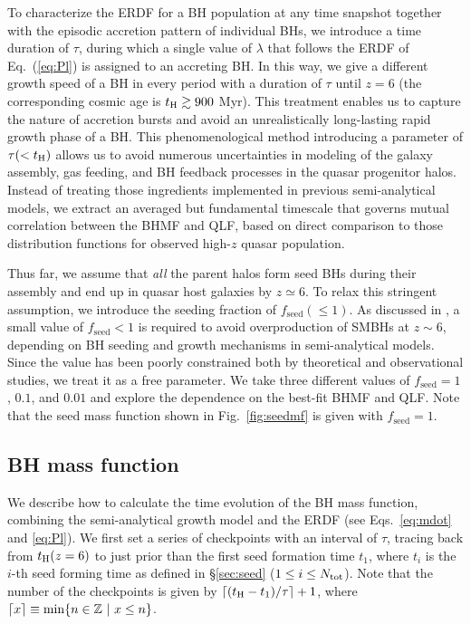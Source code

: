 \documentclass[twocolumn, twocolappendix]{aastex63}
\newcommand{\tlife}{\tau}
\newcommand{\fseed}{f_\mathrm{seed}}
\newcommand{\Nt}{N_\mathrm{t}}
\begin{document}
\begin{CJK*}{UTF8}{gbsn}
To characterize the ERDF for a BH population at any time snapshot together with the episodic 
accretion pattern of individual BHs, 
we introduce a time duration of $\tlife$, during which a single value of $\lambda$ that follows 
the ERDF of Eq.~(\ref{eq:Pl}) is assigned to an accreting BH.
In this way, we give a different growth speed of a BH in every period with a duration of $\tlife$ until $z=6$ 
(the corresponding cosmic age is $t_{\rm H}\gtrsim 900$ Myr).
This treatment enables us to capture the nature of accretion bursts and avoid an unrealistically 
long-lasting rapid growth phase of a BH.
This phenomenological method introducing a parameter of $\tlife(<t_{\rm H})$ allows us to avoid 
numerous uncertainties in modeling of the galaxy assembly, gas feeding, and BH feedback processes in the quasar 
progenitor halos.
Instead of treating those ingredients implemented in previous semi-analytical models, we extract 
an averaged but fundamental timescale that governs mutual correlation between the BHMF and QLF,
based on direct comparison to those distribution functions for observed high-$z$ quasar population.


Thus far, we assume that {\it all} the parent halos form seed BHs during their assembly and end up in quasar host galaxies by $z\simeq 6$.
To relax this stringent assumption, we introduce the seeding fraction of $\fseed (\leq 1)$.
As discussed in \citet{2009ApJ...696.1798T}, a small value of $\fseed <1$ is required to avoid overproduction of SMBHs at $z\sim 6$,
depending on BH seeding and growth mechanisms in semi-analytical models.
Since the value has been poorly constrained both by theoretical and observational studies, we treat it as a free parameter.
We take three different values of $\fseed = 1$, $0.1$, and $0.01$ and explore the dependence on the best-fit BHMF and QLF.
Note that the seed mass function shown in Fig.~\ref{fig:seedmf} is given with $\fseed = 1$.



\subsection{BH mass function}\label{sec:MF}

We describe how to calculate the time evolution of the BH mass function, 
combining the semi-analytical growth model and the ERDF (see Eqs.~\ref{eq:mdot} and \ref{eq:Pl}).
We first set a series of checkpoints with an interval of $\tlife$, 
tracing back from $t_{\rm H}(z=6)$ to just prior than the first seed formation time $t_1$, where $t_i$ is the $i$-th seed forming time
as defined in \S\ref{sec:seed} ($1\leq i\leq N_{\rm tot}$).
Note that the number of the checkpoints is given by $\lceil (t_{\rm H}-t_1)/\tau \rceil+1$, where $\lceil x\rceil \equiv {\rm min}\{n \in \mathbb{Z}~ |~x\leq n\}$.


\end{CJK*}
\end{document}
